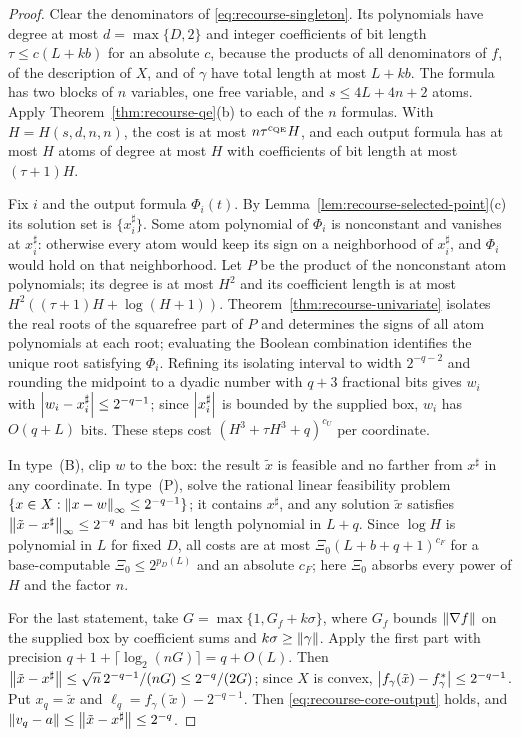 \begin{proof}
Clear the denominators of \eqref{eq:recourse-singleton}. Its polynomials
have degree at most $d=\max\{D,2\}$ and integer coefficients of bit
length $\tau\le c(L+kb)$ for an absolute $c$, because the products of
all denominators of $f$, of the description of $X$, and of $\gamma$ have
total length at most $L+kb$. The formula has two blocks of $n$
variables, one free variable, and $s\le4L+4n+2$ atoms. Apply
Theorem~\ref{thm:recourse-qe}(b) to each of the $n$ formulas. With
$H=H(s,d,n,n)$, the cost is at most $n\tau^{c_{\rm QE}}H$, and each
output formula has at most $H$ atoms of degree at most $H$ with
coefficients of bit length at most $(\tau+1)H$.

Fix $i$ and the output formula $\Phi_i(t)$. By
Lemma~\ref{lem:recourse-selected-point}(c) its solution set is
$\{x^\sharp_i\}$. Some atom polynomial of $\Phi_i$ is nonconstant and
vanishes at $x^\sharp_i$: otherwise every atom would keep its sign on a
neighborhood of $x^\sharp_i$, and $\Phi_i$ would hold on that
neighborhood. Let $P$ be the product of the nonconstant atom
polynomials; its degree is at most $H^2$ and its coefficient length is
at most $H^2((\tau+1)H+\log(H+1))$. Theorem~\ref{thm:recourse-univariate}
isolates the real roots of the squarefree part of $P$ and determines the
signs of all atom polynomials at each root; evaluating the Boolean
combination identifies the unique root satisfying $\Phi_i$. Refining
its isolating interval to width $2^{-q-2}$ and rounding the midpoint to
a dyadic number with $q+3$ fractional bits gives $w_i$ with
$\left\lvert w_i-x^\sharp_i\right\rvert\le2^{-q-1}$; since $\left\lvert x^\sharp_i\right\rvert$ is bounded
by the supplied box, $w_i$ has $O(q+L)$ bits. These steps cost
$(H^3+\tau H^3+q)^{c_U}$ per coordinate.

In type~(B), clip $w$ to the box: the result $\tilde x$ is feasible and
no farther from $x^\sharp$ in any coordinate. In type~(P), solve the
rational linear feasibility problem $\{x\in X:\left\lVert x-w\right\rVert_\infty\le2^{-q-1}\}$;
it contains $x^\sharp$, and any solution $\tilde x$ satisfies
$\left\lVert\tilde x-x^\sharp\right\rVert_\infty\le2^{-q}$ and has bit length polynomial
in $L+q$. Since $\log H$ is polynomial in $L$ for fixed $D$, all costs
are at most $\Xi_0(L+b+q+1)^{c_F}$ for a base-computable
$\Xi_0\le2^{p_D(L)}$ and an absolute $c_F$; here $\Xi_0$ absorbs every
power of $H$ and the factor $n$.

For the last statement, take $G=\max\{1,G_f+k\sigma\}$, where $G_f$
bounds $\left\lVert\nabla f\right\rVert$ on the supplied box by coefficient sums and
$k\sigma\ge\left\lVert\gamma\right\rVert$. Apply the first part with
precision $q+1+\lceil\log_2(nG)\rceil=q+O(L)$. Then
$\left\lVert\tilde x-x^\sharp\right\rVert\le\sqrt n\,2^{-q-1}/(nG)\le2^{-q}/(2G)$; since $X$
is convex, $\left\lvert f_\gamma(\tilde x)-f_\gamma^*\right\rvert\le2^{-q-1}$. Put
$x_q=\tilde x$ and $\ell_q=f_\gamma(\tilde x)-2^{-q-1}$. Then
\eqref{eq:recourse-core-output} holds, and
$\left\lVert v_q-a\right\rVert\le\left\lVert\tilde x-x^\sharp\right\rVert\le2^{-q}$.
\end{proof}

